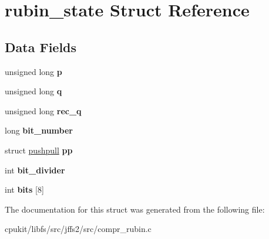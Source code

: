 \hypertarget{structrubin__state}{}\section{rubin\+\_\+state Struct Reference}
\label{structrubin__state}
\subsection*{Data Fields}
\begin{DoxyCompactItemize}
\item 
\mbox{\label{structrubin__state_ae648526b88feca39e7d82a62883d86cb}} 
unsigned long {\bfseries p}
\item 
\mbox{\label{structrubin__state_a6bc9c9faea27759ba09445e96e6d25fd}} 
unsigned long {\bfseries q}
\item 
\mbox{\label{structrubin__state_af06b1956f63548d498502aa21a81f4fb}} 
unsigned long {\bfseries rec\+\_\+q}
\item 
\mbox{\label{structrubin__state_a26a429ca0e873425fcdca2211ed47b4c}} 
long {\bfseries bit\+\_\+number}
\item 
\mbox{\label{structrubin__state_aab5699587eab5336e0b49978e33f93a3}} 
struct \mbox{\hyperlink{structpushpull}{pushpull}} {\bfseries pp}
\item 
\mbox{\label{structrubin__state_aebd5b34fac7bd5aca17a33f3294dcbe7}} 
int {\bfseries bit\+\_\+divider}
\item 
\mbox{\label{structrubin__state_a6166b12932d13d058e6a4f925fa2cada}} 
int {\bfseries bits} \mbox{[}8\mbox{]}
\end{DoxyCompactItemize}


The documentation for this struct was generated from the following file\+:\begin{DoxyCompactItemize}
\item 
cpukit/libfs/src/jffs2/src/compr\+\_\+rubin.\+c\end{DoxyCompactItemize}
